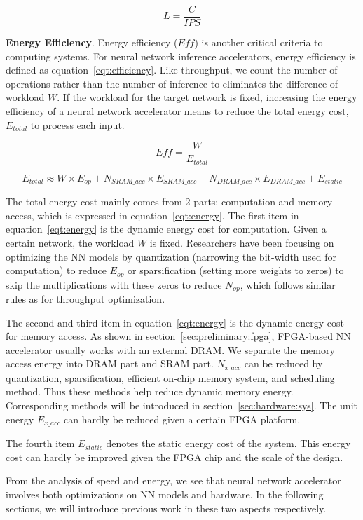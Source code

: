 \begin{equation}\label{eqt:latency}
    L = \frac{C}{IPS}
\end{equation}

\textbf{Energy Efficiency}. Energy efficiency ($Eff$) is another critical criteria to computing systems. For neural network inference accelerators, energy efficiency is defined as equation~\ref{eqt:efficiency}. Like throughput, we count the number of operations rather than the number of inference to eliminates the difference of workload $W$. If the workload for the target network is fixed, increasing the energy efficiency of a neural network accelerator means to reduce the total energy cost, $E_{total}$ to process each input. 

\begin{equation}\label{eqt:efficiency}
    Eff = \frac{W}{E_{total}}
\end{equation}
    
\begin{equation}\label{eqt:energy}
    E_{total} \approx W\times E_{op} + N_{SRAM\_acc}\times E_{SRAM\_acc} + N_{DRAM\_acc}\times E_{DRAM\_acc} + E_{static}
\end{equation}

The total energy cost mainly comes from 2 parts: computation and memory access, which is expressed in equation~\ref{eqt:energy}. The first item in equation~\ref{eqt:energy} is the dynamic energy cost for computation. Given a certain network, the workload $W$ is fixed. Researchers have been focusing on optimizing the NN models by quantization (narrowing the bit-width used for computation) to reduce $E_{op}$ or sparsification (setting more weights to zeros) to skip the multiplications with these zeros to reduce $N_{op}$, which follows similar rules as for throughput optimization. 

The second and third item in equation~\ref{eqt:energy} is the dynamic energy cost for memory access. As shown in section~\ref{sec:preliminary:fpga}, FPGA-based NN accelerator usually works with an external DRAM. We separate the memory access energy into DRAM part and SRAM part. $N_{x\_acc}$ can be reduced by quantization, sparsification, efficient on-chip memory system, and scheduling method. Thus these methods help reduce dynamic memory energy. Corresponding methods will be introduced in section~\ref{sec:hardware:sys}. The unit energy $E_{x\_acc}$ can hardly be reduced given a certain FPGA platform.

The fourth item $E_{static}$ denotes the static energy cost of the system. This energy cost can hardly be improved given the FPGA chip and the scale of the design.

From the analysis of speed and energy, we see that neural network accelerator involves both optimizations on NN models and hardware. In the following sections, we will introduce previous work in these two aspects respectively.
